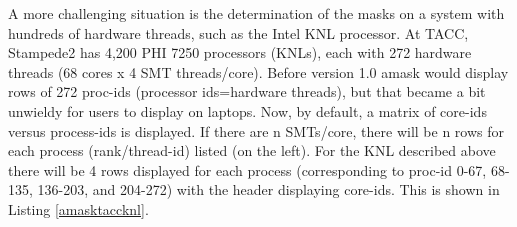 \documentclass[10pt,a4paper]{report}
\begin{document}
A more challenging situation is the determination of the masks on a system with 
hundreds of hardware threads, such as the Intel KNL processor.  At TACC, Stampede2 
has 4,200 PHI 7250 processors (KNLs), each with 272 hardware threads (68 cores x 
4 SMT threads/core).  Before version 1.0  amask would display rows of 272 proc-ids 
(processor ids=hardware threads), but that became a bit unwieldy for users to 
display on laptops.  Now, by default, a matrix of core-ids versus process-ids is displayed.
If there are n SMTs/core, there will be n rows for each process (rank/thread-id) listed (on the left).
For the KNL described above there will be 4 rows displayed for each process 
(corresponding to  proc-id {0-67}, {68-135}, {136-203}, and {204-272}) with the header displaying core-ids.  
This is shown in Listing \ref{amasktaccknl}.

\end{document}
